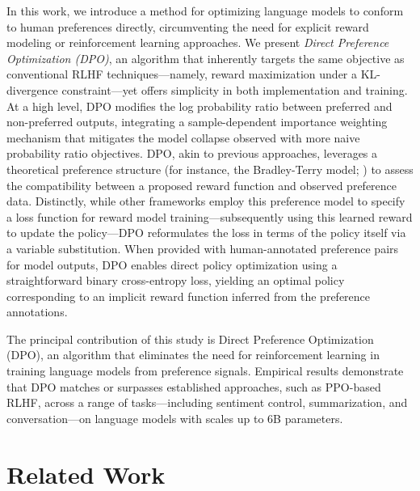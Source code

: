 In this work, we introduce a method for optimizing language models to conform to human preferences directly, circumventing the need for explicit reward modeling or reinforcement learning approaches. We present \textit{{Direct Preference Optimization} (DPO)}, an algorithm that inherently targets the same objective as conventional RLHF techniques—namely, reward maximization under a KL-divergence constraint—yet offers simplicity in both implementation and training. At a high level, DPO modifies the log probability ratio between preferred and non-preferred outputs, integrating a sample-dependent importance weighting mechanism that mitigates the model collapse observed with more naive probability ratio objectives. DPO, akin to previous approaches, leverages a theoretical preference structure (for instance, the Bradley-Terry model; \cite{bradley1952rankanalysis}) to assess the compatibility between a proposed reward function and observed preference data. Distinctly, while other frameworks employ this preference model to specify a loss function for reward model training—subsequently using this learned reward to update the policy—DPO reformulates the loss in terms of the policy itself via a variable substitution. When provided with human-annotated preference pairs for model outputs, DPO enables direct policy optimization using a straightforward binary cross-entropy loss, yielding an optimal policy corresponding to an implicit reward function inferred from the preference annotations.

The principal contribution of this study is Direct Preference Optimization (DPO), an algorithm that eliminates the need for reinforcement learning in training language models from preference signals. Empirical results demonstrate that DPO matches or surpasses established approaches, such as PPO-based RLHF, across a range of tasks—including sentiment control, summarization, and conversation—on language models with scales up to 6B parameters.

\section{Related Work}

